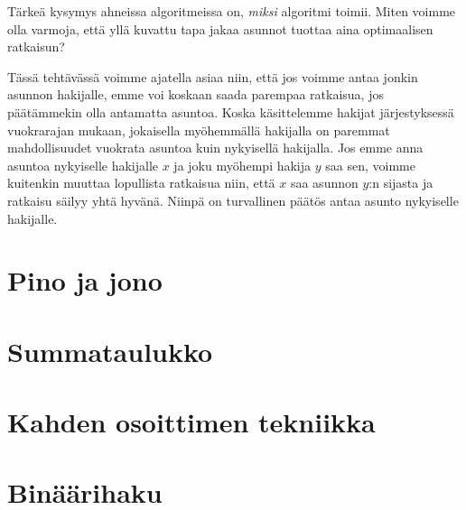 Tärkeä kysymys ahneissa algoritmeissa on, \emph{miksi}
algoritmi toimii. Miten voimme olla varmoja, että yllä kuvattu tapa
jakaa asunnot tuottaa aina optimaalisen ratkaisun?

Tässä tehtävässä voimme ajatella asiaa niin,
että jos voimme antaa jonkin asunnon hakijalle,
emme voi koskaan saada parempaa ratkaisua,
jos päätämmekin olla antamatta asuntoa.
Koska käsittelemme hakijat järjestyk\-sessä vuokrarajan mukaan,
jokaisella myöhemmällä hakijalla on paremmat mahdollisuudet
vuokrata asuntoa kuin nykyisellä hakijalla.
Jos emme anna asuntoa nykyiselle hakijalle $x$
ja joku myöhempi hakija $y$ saa sen, voimme kuitenkin 
muuttaa lopullista ratkaisua niin, että $x$
saa asunnon $y$:n sijasta ja ratkaisu säilyy yhtä hyvänä.
Niinpä on turvallinen päätös antaa asunto nykyiselle hakijalle.

\section{Pino ja jono}

\section{Summataulukko}

\section{Kahden osoittimen tekniikka}

\section{Binäärihaku}
